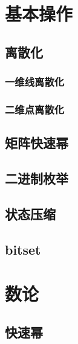 \documentclass{article}
\begin{document}
\begin{titlepage}

\thispagestyle{empty}
\pagebreak
\pagestyle{plain}
\tableofcontents
\end{titlepage}


\section{基本操作}

\subsection{﻿离散化}
\subsubsection{一维线离散化}

\subsubsection{二维点离散化}


\subsection{矩阵快速幂}


\subsection{二进制枚举}


\subsection{状态压缩}


\subsection{bitset}



\section{数论}

\subsection{快速幂}

\end{document}
